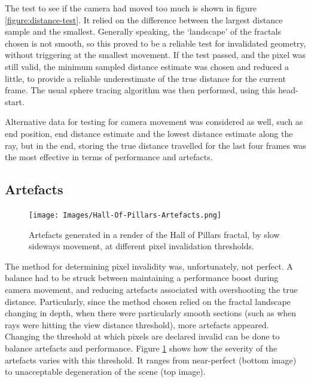 The test to see if the camera had moved too much is shown in figure \ref{figure:distance-test}. It relied on the difference between the largest distance sample and the smallest. Generally speaking, the `landscape' of the fractals chosen is not smooth, so this proved to be a reliable test for invalidated geometry, without triggering at the smallest movement. If the test passed, and the pixel was still valid, the minimum sampled distance estimate was chosen and reduced a little, to provide a reliable underestimate of the true distance for the current frame. The usual sphere tracing algorithm was then performed, using this head-start.\newline

Alternative data for testing for camera movement was considered as well, such as end position, end distance estimate and the lowest distance estimate along the ray, but in the end, storing the true distance travelled for the last four frames was the most effective in terms of performance and artefacts.

\subsection{Artefacts}

\begin{figure}[ht]
	\centering
	\texttt{[image: Images/Hall-Of-Pillars-Artefacts.png]}
	\caption{Artefacts generated in a render of the Hall of Pillars fractal, by slow sideways movement, at different pixel invalidation thresholds.}
	\label{figure:hall-of-pillars-artefacts}
\end{figure}

The method for determining pixel invalidity was, unfortunately, not perfect. A balance had to be struck between maintaining a performance boost during camera movement, and reducing artefacts associated with overshooting the true distance. Particularly, since the method chosen relied on the fractal landscape changing in depth, when there were particularly smooth sections (such as when rays were hitting the view distance threshold), more artefacts appeared. Changing the threshold at which pixels are declared invalid can be done to balance artefacts and performance. Figure \ref{figure:hall-of-pillars-artefacts} shows how the severity of the artefacts varies with this threshold. It ranges from near-perfect (bottom image) to unacceptable degeneration of the scene (top image).\newline

